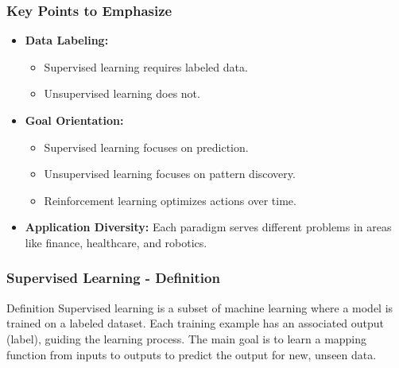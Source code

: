 \documentclass[aspectratio=169]{beamer}
\begin{document}
\begin{frame}[fragile]
    \frametitle{Key Points to Emphasize}
    \begin{itemize}
        \item \textbf{Data Labeling:} 
            \begin{itemize}
                \item Supervised learning requires labeled data.
                \item Unsupervised learning does not.
            \end{itemize}
        \item \textbf{Goal Orientation:} 
            \begin{itemize}
                \item Supervised learning focuses on prediction.
                \item Unsupervised learning focuses on pattern discovery.
                \item Reinforcement learning optimizes actions over time.
            \end{itemize}
        \item \textbf{Application Diversity:} Each paradigm serves different problems in areas like finance, healthcare, and robotics.
    \end{itemize}
\end{frame}

\begin{frame}[fragile]
    \frametitle{Supervised Learning - Definition}
    \begin{block}{Definition}
        Supervised learning is a subset of machine learning where a model is trained on a labeled dataset. Each training example has an associated output (label), guiding the learning process. The main goal is to learn a mapping function from inputs to outputs to predict the output for new, unseen data.
    \end{block}
\end{frame}
\end{document}

